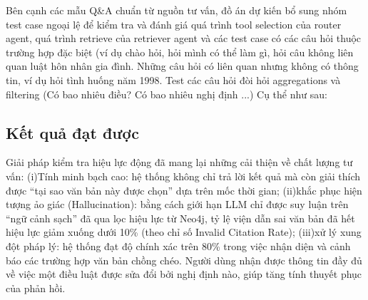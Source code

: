 \documentclass[../DoAn.tex]{subfiles}
\begin{document}
Bên cạnh các mẫu Q\&A chuẩn từ nguồn tư vấn, đồ án dự kiến bổ sung nhóm test case ngoại lệ để kiểm tra và đánh giá quá trình tool selection của router agent, quá trình retrieve của retriever agent và các test case có các câu hỏi thuộc trường hợp đặc biệt (ví dụ chào hỏi, hỏi mình có thể làm gì, hỏi câu không liên quan luật hôn nhân gia đình. Những câu hỏi có liên quan nhưng không có thông tin, ví dụ hỏi tình huống năm 1998. Test các câu hỏi đòi hỏi aggregations và filtering (Có bao nhiêu điều? Có bao nhiêu nghị định ...) Cụ thể như sau:

\subsection{Kết quả đạt được}
\label{subsection:5.1.3}

Giải pháp kiểm tra hiệu lực động đã mang lại những cải thiện về chất lượng tư vấn: (i)Tính minh bạch cao: hệ thống không chỉ trả lời kết quả mà còn giải thích được ``tại sao văn bản này được chọn'' dựa trên mốc thời gian; (ii)khắc phục hiện tượng ảo giác (Hallucination): bằng cách giới hạn LLM chỉ được suy luận trên ``ngữ cảnh sạch'' đã qua lọc hiệu lực từ Neo4j, tỷ lệ viện dẫn sai văn bản đã hết hiệu lực giảm xuống dưới 10\% (theo chỉ số Invalid Citation Rate); (iii)xử lý xung đột pháp lý: hệ thống đạt độ chính xác trên 80\% trong việc nhận diện và cảnh báo các trường hợp văn bản chồng chéo. Người dùng nhận được thông tin đầy đủ về việc một điều luật được sửa đổi bởi nghị định nào, giúp tăng tính thuyết phục của phản hồi.
\end{document}

